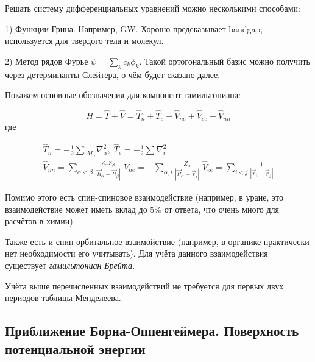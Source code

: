 \documentclass[12pt, oneside]{article}
\numberwithin{equation}{section}  %
\begin{document}
Решать систему дифференциальных уравнений можно несколькими способами:

1) Функции Грина. Например, GW. Хорошо предсказывает bandgap, используется для твердого тела и молекул.

2) Метод рядов Фурье \(\psi = \sum_k c_k \phi_k\). Такой ортогональный базис можно получить через детерминанты Слейтера, о чём будет сказано далее.


Покажем основные обозначения для компонент гамильтониана:

\begin{equation}
    \hat{H} = \hat{T} + \hat{V} = \hat{T}_n + \hat{T}_e + \hat{V}_{ne} + \hat{V}_{ee} + \hat{V}_{nn}
\end{equation}
где 


\begin{gather}
\label{eq:kin}
\hat{T}_n = - \frac{1}{2} \sum \frac{1}{M_\alpha} \nabla_\alpha^2,\; \hat{T}_e = - \frac{1}{2} \sum \nabla_i^2 \\
\hat{V}_{nn} = \sum_{\alpha < \beta} \frac{Z_\alpha Z_\beta}{|\vec{R}_\alpha - \vec{R}_\beta|} \;
\hat{V}_{ne} = - \sum_{\alpha, i} \frac{Z_\alpha}{|\vec{R}_\alpha - \vec{r}_i|} \;
\hat{V}_{ee} = \sum_{i < j} \frac{1}{|\vec{r}_i - \vec{r}_j|}
\end{gather}

Помимо этого есть спин-спиновое взаимодействие (например, в уране, это взаимодействие может иметь вклад до \(5 \%\) от ответа, что очень много для расчётов в химии)

Также есть и спин-орбитальное взаимойствие (например, в органике практически нет необходимости его учитывать). Для учёта данного взаимодействия существует \textit{гамильтониан Брейта}.

Учёта выше перечисленных взаимодействий не требуется для первых двух периодов таблицы Менделеева. 

\subsection{Приближение Борна-Оппенгеймера. Поверхность потенциальной энергии}
\end{document}
